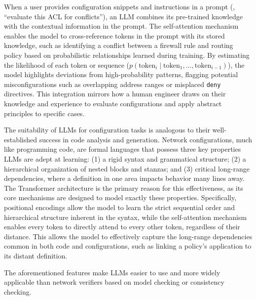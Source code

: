 When a user provides configuration snippets and instructions in a prompt (\eg, ``evaluate this ACL for conflicts''), an LLM combines its pre-trained knowledge with the contextual information in the prompt. The self-attention mechanism enables the model to cross-reference tokens in the prompt with its stored knowledge, such as identifying a conflict between a firewall rule and routing policy based on probabilistic relationships learned during training. By estimating the likelihood of each token or sequence (\(p(\text{token}_i \mid \text{token}_1, \ldots, \text{token}_{i-1})\)), the model highlights deviations from high-probability patterns, flagging potential misconfigurations such as overlapping address ranges or misplaced \texttt{deny} directives. This integration mirrors how a human engineer draws on their knowledge and experience to evaluate configurations and apply abstract principles to specific cases.

The suitability of LLMs for configuration tasks is analogous to their well-established success in code analysis and generation. Network configurations, much like programming code, are formal languages that possess three key properties LLMs are adept at learning: (1) a rigid syntax and grammatical structure; (2) a hierarchical organization of nested blocks and stanzas; and (3) critical long-range dependencies, where a definition in one area impacts behavior many lines away. The Transformer architecture is the primary reason for this effectiveness, as its core mechanisms are designed to model exactly these properties. Specifically, positional encodings allow the model to learn the strict sequential order and hierarchical structure inherent in the syntax, while the self-attention mechanism enables every token to directly attend to every other token, regardless of their distance. This allows the model to effectively capture the long-range dependencies common in both code and configurations, such as linking a policy's application to its distant definition.

The aforementioned features make LLMs easier to use and more widely applicable than network verifiers based on model checking or consistency checking. 

